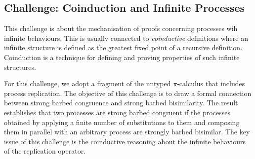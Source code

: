 \subsection{Challenge: Coinduction and Infinite Processes}
\label{sec:challenge:coinduction}


This challenge is  about the mechanisation of proofs concerning processes wih infinite behaviours.
%
This is usually connected to \emph{coinductive} definitions where an infinite
structure is defined as the greatest fixed point of a recursive
definition.
%
Coinduction is a technique for defining and proving properties of
such infinite structures.
%
%

For this challenge, we adopt a fragment of the untyped $\pi$-calculus
that includes process replication.
The objective of this challenge is to %
draw a formal connection between strong barbed congruence and strong
barbed bisimilarity.  %
The result establishes that two processes are strong barbed congruent
if the processes obtained by applying a finite number of substitutions to
them and composing them in parallel with an arbitrary process are
strongly barbed bisimilar.
The key issue of this challenge is the coinductive reasoning about the infinite behaviours of the replication operator.


